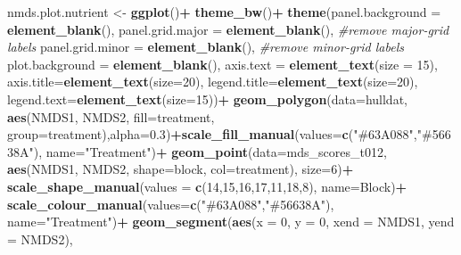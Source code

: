 \documentclass[
]{article}
\newenvironment{Shaded}{\begin{snugshade}}{\end{snugshade}}
\newcommand{\AttributeTok}[1]{\textcolor[rgb]{0.13,0.29,0.53}{#1}}
\newcommand{\CommentTok}[1]{\textcolor[rgb]{0.56,0.35,0.01}{\textit{#1}}}
\newcommand{\DecValTok}[1]{\textcolor[rgb]{0.00,0.00,0.81}{#1}}
\newcommand{\FloatTok}[1]{\textcolor[rgb]{0.00,0.00,0.81}{#1}}
\newcommand{\FunctionTok}[1]{\textcolor[rgb]{0.13,0.29,0.53}{\textbf{#1}}}
\newcommand{\NormalTok}[1]{#1}
\newcommand{\OtherTok}[1]{\textcolor[rgb]{0.56,0.35,0.01}{#1}}
\newcommand{\SpecialCharTok}[1]{\textcolor[rgb]{0.81,0.36,0.00}{\textbf{#1}}}
\newcommand{\StringTok}[1]{\textcolor[rgb]{0.31,0.60,0.02}{#1}}
\begin{document}
\begin{Shaded}
\begin{Highlighting}[]
\NormalTok{nmds.plot.nutrient }\OtherTok{\textless{}{-}} \FunctionTok{ggplot}\NormalTok{()}\SpecialCharTok{+}
  \FunctionTok{theme\_bw}\NormalTok{()}\SpecialCharTok{+}
  \FunctionTok{theme}\NormalTok{(}\AttributeTok{panel.background =} \FunctionTok{element\_blank}\NormalTok{(),}
        \AttributeTok{panel.grid.major =} \FunctionTok{element\_blank}\NormalTok{(),  }\CommentTok{\#remove major{-}grid labels}
        \AttributeTok{panel.grid.minor =} \FunctionTok{element\_blank}\NormalTok{(),  }\CommentTok{\#remove minor{-}grid labels}
        \AttributeTok{plot.background =} \FunctionTok{element\_blank}\NormalTok{(), }
        \AttributeTok{axis.text =} \FunctionTok{element\_text}\NormalTok{(}\AttributeTok{size =} \DecValTok{15}\NormalTok{),}
        \AttributeTok{axis.title=}\FunctionTok{element\_text}\NormalTok{(}\AttributeTok{size=}\DecValTok{20}\NormalTok{),}
        \AttributeTok{legend.title=}\FunctionTok{element\_text}\NormalTok{(}\AttributeTok{size=}\DecValTok{20}\NormalTok{), }
        \AttributeTok{legend.text=}\FunctionTok{element\_text}\NormalTok{(}\AttributeTok{size=}\DecValTok{15}\NormalTok{))}\SpecialCharTok{+}
  \FunctionTok{geom\_polygon}\NormalTok{(}\AttributeTok{data=}\NormalTok{hulldat, }\FunctionTok{aes}\NormalTok{(NMDS1, NMDS2, }\AttributeTok{fill=}\NormalTok{treatment, }\AttributeTok{group=}\NormalTok{treatment),}\AttributeTok{alpha=}\FloatTok{0.3}\NormalTok{)}\SpecialCharTok{+}\FunctionTok{scale\_fill\_manual}\NormalTok{(}\AttributeTok{values=}\FunctionTok{c}\NormalTok{(}\StringTok{"\#63A088"}\NormalTok{,}\StringTok{"\#56638A"}\NormalTok{), }\AttributeTok{name=}\StringTok{"Treatment"}\NormalTok{)}\SpecialCharTok{+}
  \FunctionTok{geom\_point}\NormalTok{(}\AttributeTok{data=}\NormalTok{mds\_scores\_t012, }\FunctionTok{aes}\NormalTok{(NMDS1, NMDS2, }\AttributeTok{shape=}\NormalTok{block, }\AttributeTok{col=}\NormalTok{treatment), }\AttributeTok{size=}\DecValTok{6}\NormalTok{)}\SpecialCharTok{+} \FunctionTok{scale\_shape\_manual}\NormalTok{(}\AttributeTok{values =} \FunctionTok{c}\NormalTok{(}\DecValTok{14}\NormalTok{,}\DecValTok{15}\NormalTok{,}\DecValTok{16}\NormalTok{,}\DecValTok{17}\NormalTok{,}\DecValTok{11}\NormalTok{,}\DecValTok{18}\NormalTok{,}\DecValTok{8}\NormalTok{), }\AttributeTok{name=}\StringTok{\textquotesingle{}Block\textquotesingle{}}\NormalTok{)}\SpecialCharTok{+}
  \FunctionTok{scale\_colour\_manual}\NormalTok{(}\AttributeTok{values=}\FunctionTok{c}\NormalTok{(}\StringTok{"\#63A088"}\NormalTok{,}\StringTok{"\#56638A"}\NormalTok{), }\AttributeTok{name=}\StringTok{"Treatment"}\NormalTok{)}\SpecialCharTok{+}
  \FunctionTok{geom\_segment}\NormalTok{(}\FunctionTok{aes}\NormalTok{(}\AttributeTok{x =} \DecValTok{0}\NormalTok{, }\AttributeTok{y =} \DecValTok{0}\NormalTok{, }\AttributeTok{xend =}\NormalTok{ NMDS1, }\AttributeTok{yend =}\NormalTok{ NMDS2), }

\end{Highlighting}
\end{Shaded}
\end{document}
